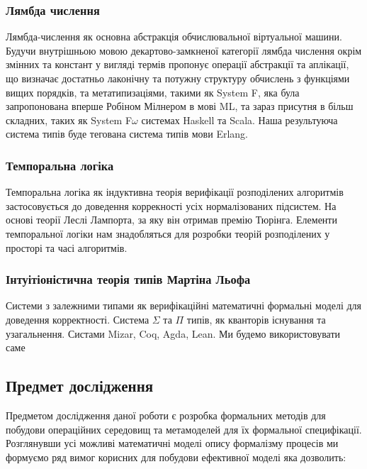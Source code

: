\documentclass[11pt,oneside]{article}
\begin{document}
   \subsubsection*{Лямбда числення}
   Лямбда-числення як основна абстракція обчислювальної віртуальної машини.
   Будучи внутрішньою мовою декартово-замкненої категорії лямбда числення окрім змінних
   та констант у вигляді термів пропонує операції абстракції та аплікації, що визначає
   достатньо лаконічну та потужну структуру обчислень з функціями вищих порядків,
   та метатипизаціями, такими як System F, яка була запропонована
   вперше Робіном Мілнером в мові ML, та зараз присутня в більш складних,
   таких як System F$\omega$ системах Haskell та Scala. Наша результуюча система
   типів буде тегована система типів мови Erlang.

   \subsubsection*{Темпоральна логіка}
   Темпоральна логіка як індуктивна теорія верифікації розподілених алгоритмів
   застосовується до доведення коррекності усіх нормалізованих підсистем. На основі
   теорії  Леслі Лампорта\cite{tla}, за яку він отримав премію Тюрінга.
   Елементи темпоральної логіки нам знадобляться для розробки теорій
   розподілених у просторі та часі алгоритмів.\\

   \subsubsection*{Інтуітіоністична теорія типів Мартіна Льофа}
   Системи з залежними типами як верифікаційні математичні формальні моделі
   для доведення корректності. Система $\Sigma$ та $\Pi$ типів, як кванторів
   існування та узагальнення. Систами Mizar, Coq, Agda, Lean. Ми будемо
   використовувати саме

\newpage
\subsection{Предмет дослідження}
\vspace{0.5cm}

   Предметом дослідження даної роботи є розробка формальних методів для побудови
   операційних середовищ та метамоделей для їх формальної специфікації. Розглянувши усі
   можливі математичні моделі опису формалізму процесів ми формуємо ряд вимог корисних
   для побудови ефективної моделі яка дозволить:
\end{document}
